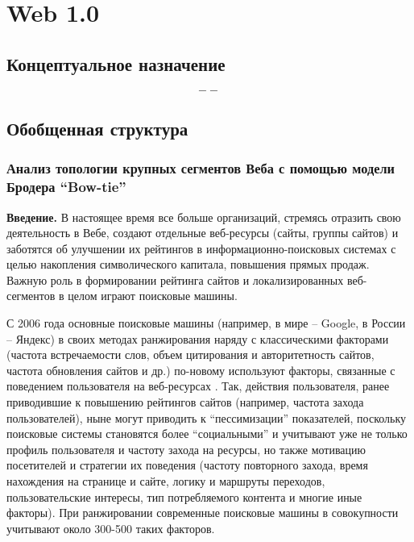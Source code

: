 \chapter{Web 1.0}\label{ch:ch1}

\section{Концептуальное назначение}\label{sec:ch1/sec1}

\[
--
\]

\section{Обобщенная структура}\label{sec:ch1/sec2}

\subsection{Анализ топологии крупных сегментов Веба с помощью модели Бродера “Bow-tie”}\label{subsec:ch1/sec2/sub1}

\textbf{Введение.} В настоящее время все больше организаций, стремясь отразить свою деятельность в Вебе, создают отдельные веб-ресурсы (сайты, группы сайтов) и заботятся об улучшении их рейтингов в информационно-поисковых системах с целью накопления символического капитала, повышения прямых продаж. Важную роль в формировании рейтинга сайтов и локализированных веб-сегментов в целом играют поисковые машины.

С 2006 года основные поисковые машины (например, в мире -- Google, в России -- Яндекс) в своих методах ранжирования наряду с классическими факторами \cite{Kleinberg, BrinPage, Chakrabarti} (частота встречаемости слов, объем цитирования и авторитетность сайтов, частота обновления сайтов и др.) по-новому используют факторы, связанные с поведением пользователя на веб-ресурсах \cite{GuhaKunduBhadra,AntoniouPlegasTsakalidis,FeuerSavevAslam}. Так, действия пользователя, ранее приводившие к повышению рейтингов сайтов (например, частота захода пользователей), ныне могут приводить к “пессимизации” показателей, поскольку поисковые системы становятся более “социальными” и учитывают уже не только профиль пользователя и частоту захода на ресурсы, но также мотивацию посетителей и стратегии их поведения (частоту повторного захода, время нахождения на странице и сайте, логику и маршруты переходов, пользовательские интересы, тип потребляемого контента и многие иные факторы). При ранжировании современные поисковые машины в совокупности учитывают около 300-500 таких факторов.

